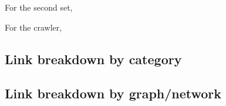 For the second set,

For the crawler,









\subsection{Link breakdown by category}

\subsection{Link breakdown by graph/network}







